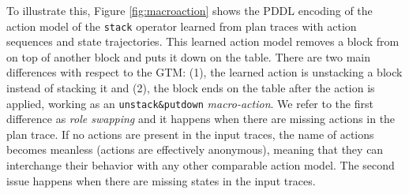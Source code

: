 To illustrate this, Figure \ref{fig:macroaction} shows the PDDL encoding of the action model of the {\tt stack} operator learned from plan traces with \NO action sequences and state trajectories. This learned action model removes a block from on top of another block and puts it down on the table. There are two main differences with respect to the GTM: (1), the learned action is unstacking a block instead of stacking it and (2), the block ends on the table after the action is applied, working as an {\tt unstack\&putdown} \emph{macro-action}. We refer to the first difference as \emph{role swapping} and it happens when there are missing actions in the plan trace. If no actions are present in the input traces, the name of actions becomes meanless (actions are effectively anonymous), meaning that they can interchange their behavior with any other comparable action model. The second issue happens when there are missing states in the input traces. 


